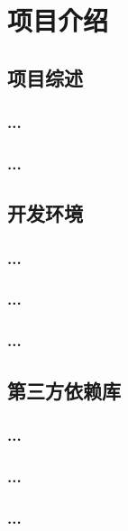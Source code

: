 

    \chapter{项目介绍}

    \lipsum[1-5]
    \section{项目综述}
    \subsection{...}

    \lipsum[6-10]

    \subsection{...}


    \section{开发环境}
    \subsection{...}

    \lipsum[11-15]

    \subsection{...}

    \subsection{...}



    \section{第三方依赖库}
    \subsection{...}

    \lipsum[21-30]

    \subsection{...}


    \subsection{...}

